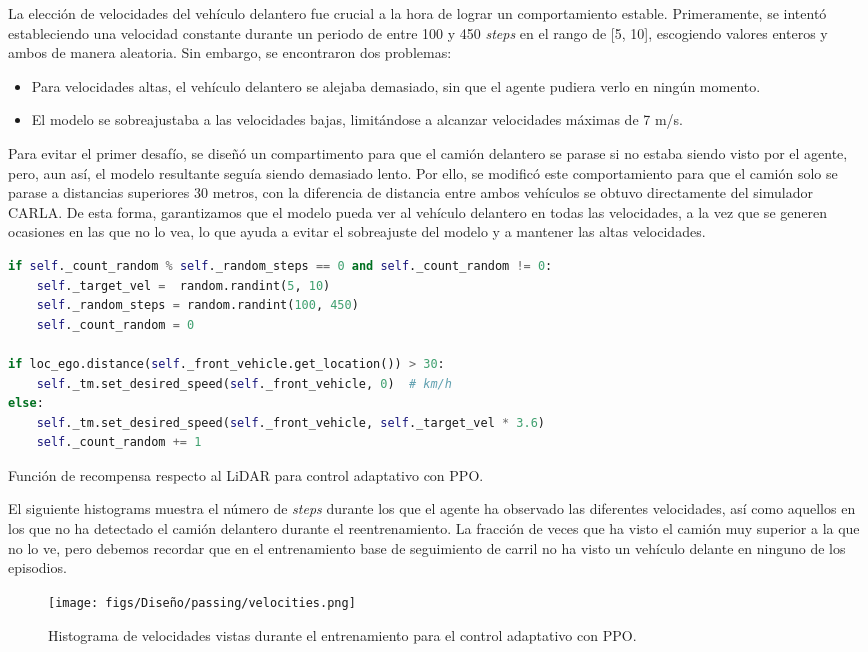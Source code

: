 La elección de velocidades del vehículo delantero fue crucial a la hora de lograr un comportamiento estable. Primeramente, se intentó estableciendo una velocidad constante durante un periodo de entre 100 y 450 \textit{steps} en el rango de [5, 10], escogiendo valores enteros y ambos de manera aleatoria. Sin embargo, se encontraron dos problemas:
  \begin{itemize}
        \item Para velocidades altas, el vehículo delantero se alejaba demasiado, sin que el agente pudiera verlo en ningún momento.
        \item El modelo se sobreajustaba a las velocidades bajas, limitándose a alcanzar velocidades máximas de 7 m/s.
    \end{itemize}
Para evitar el primer desafío, se diseñó un compartimento para que el camión delantero se parase si no estaba siendo visto por el agente, pero, aun así, el modelo resultante seguía siendo demasiado lento. Por ello, se modificó este comportamiento para que el camión solo se parase a distancias superiores 30 metros, con la diferencia de distancia entre ambos vehículos se obtuvo directamente del simulador CARLA. De esta forma, garantizamos que el modelo pueda ver al vehículo delantero en todas las velocidades, a la vez que se generen ocasiones en las que no lo vea, lo que ayuda a evitar el sobreajuste del modelo y a mantener las altas velocidades.

\begin{code}[H]
\begin{lstlisting}[language=Python]
if self._count_random % self._random_steps == 0 and self._count_random != 0:
	self._target_vel =  random.randint(5, 10)
	self._random_steps = random.randint(100, 450)
	self._count_random = 0

if loc_ego.distance(self._front_vehicle.get_location()) > 30:
	self._tm.set_desired_speed(self._front_vehicle, 0)  # km/h
else:
	self._tm.set_desired_speed(self._front_vehicle, self._target_vel * 3.6)
	self._count_random += 1
\end{lstlisting}
\caption[Función de recompensa respecto al \ac{LiDAR} para control adaptativo con \ac{PPO}]{Función de recompensa respecto al \ac{LiDAR} para control adaptativo con \ac{PPO}.}
\label{cod:rew_ppo_passing}
\end{code}

El siguiente histograms muestra el número de \textit{steps} durante los que el agente ha observado las diferentes velocidades, así como aquellos en los que no ha detectado el camión delantero durante el reentrenamiento. La fracción de veces que ha visto el camión muy superior a la que no lo ve, pero debemos recordar que en el entrenamiento base de seguimiento de carril no ha visto un vehículo delante en ninguno de los episodios.
\begin{figure}[ht]
  \centering
  \texttt{[image: figs/Diseño/passing/velocities.png]}
  \caption{Histograma de velocidades vistas durante el entrenamiento para el control adaptativo con \ac{PPO}.}
  \label{fig:velocities}
\end{figure}

